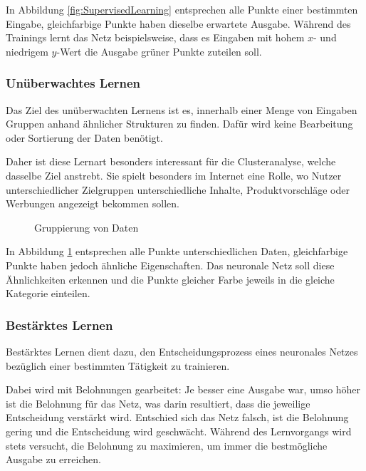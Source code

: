 \documentclass[12pt,a4]{article}
\begin{document}
In Abbildung \ref{fig:SupervisedLearning} entsprechen alle Punkte einer bestimmten Eingabe, gleichfarbige Punkte haben dieselbe erwartete Ausgabe. Während des Trainings lernt das Netz beispielsweise, dass es Eingaben mit hohem $x$- und niedrigem $y$-Wert die Ausgabe grüner Punkte zuteilen soll.

\subsubsection{Unüberwachtes Lernen}
Das Ziel des unüberwachten Lernens ist es, innerhalb einer Menge von Eingaben Gruppen anhand ähnlicher Strukturen zu finden. Dafür wird keine Bearbeitung oder Sortierung der Daten benötigt.

Daher ist diese Lernart besonders interessant für die Clusteranalyse, welche dasselbe Ziel anstrebt. Sie spielt besonders im Internet eine Rolle, wo Nutzer unterschiedlicher Zielgruppen unterschiedliche Inhalte, Produktvorschläge oder Werbungen angezeigt bekommen sollen.

\begin{figure}[!h]
\centering
{}
\caption{Gruppierung von Daten}
\label{fig:UnsupervisedLearning}
\end{figure}

In Abbildung \ref{fig:UnsupervisedLearning} entsprechen alle Punkte unterschiedlichen Daten, gleichfarbige Punkte haben jedoch ähnliche Eigenschaften. Das neuronale Netz soll diese Ähnlichkeiten erkennen und die Punkte gleicher Farbe jeweils in die gleiche Kategorie einteilen.

\subsubsection{Bestärktes Lernen}
Bestärktes Lernen dient dazu, den Entscheidungsprozess eines neuronales Netzes bezüglich einer bestimmten Tätigkeit zu trainieren.

Dabei wird mit Belohnungen gearbeitet: Je besser eine Ausgabe war, umso höher ist die Belohnung für das Netz, was darin resultiert, dass die jeweilige Entscheidung verstärkt wird. Entschied sich das Netz falsch, ist die Belohnung gering und die Entscheidung wird geschwächt. Während des Lernvorgangs wird stets versucht, die Belohnung zu maximieren, um immer die bestmögliche Ausgabe zu erreichen.
\end{document}
